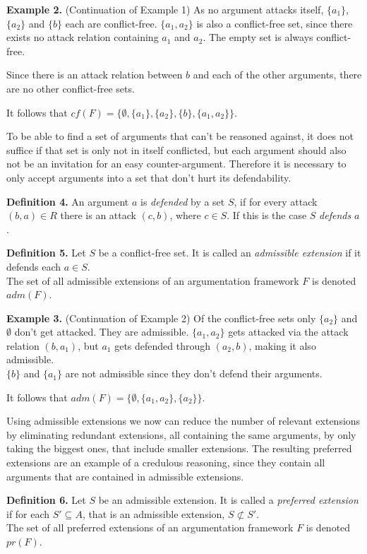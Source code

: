 \documentclass[draft,final]{vutinfth} %
\newcommand{\hl}{\par\vspace{6pt}} %
\newcommand{\cl}{\par\vspace{12pt}} %
\newcommand{\dl}{\par\vspace{24pt}} %
\begin{document}
\textbf{Example 2.} (Continuation of Example 1) As no argument attacks itself, $\{a_1\}$, $\{a_2\}$ and $\{b\}$ each are conflict-free. $\{a_1,a_2\}$ is also a conflict-free set, since there exists no attack relation containing $a_1$ and $a_2$. The empty set is always conflict-free.\hl
Since there is an attack relation between $b$ and each of the other arguments, there are no other conflict-free sets.\hl
It follows that $cf(F)=\{\emptyset,\{a_1\},\{a_2\},\{b\},\{a_1,a_2\}\}$.\dl

To be able to find a set of arguments that can't be reasoned against, it does not suffice if that set is only not in itself conflicted, but each argument should also not be an invitation for an easy counter-argument. Therefore it is necessary to only accept arguments into a set that don't hurt its defendability.\cl

\textbf{Definition 4.} An argument $a$ is \emph{defended} by a set $S$, if for every attack $(b,a)\in R$ there is an attack $(c,b)$, where $c\in S$. If this is the case $S$ \emph{defends} $a$.\cl

\textbf{Definition 5.} Let $S$ be a conflict-free set. It is called an \emph{admissible extension} if it defends each $a\in S$.\\
The set of all admissible extensions of an argumentation framework $F$ is denoted $adm(F)$.\cl

\textbf{Example 3.} (Continuation of Example 2) Of the conflict-free sets only $\{a_2\}$ and \(\emptyset\) don't get attacked. They are admissible. $\{a_1,a_2\}$ gets attacked via the attack relation $(b,a_1)$, but $a_1$ gets defended through $(a_2,b)$, making it also admissible.\\
$\{b\}$ and $\{a_1\}$ are not admissible since they don't defend their arguments.\hl
It follows that $adm(F)=\{\emptyset,\{a_1,a_2\},\{a_2\}\}$.\dl

Using admissible extensions we now can reduce the number of relevant extensions by eliminating redundant extensions, all containing the same arguments, by only taking the biggest ones, that include smaller extensions. The resulting preferred extensions are an example of a credulous reasoning, since they contain all arguments that are contained in admissible extensions.\cl

\textbf{Definition 6.} Let $S$ be an admissible extension. It is called a \emph{preferred extension} if for each $S'\subseteq A$, that is an admissible extension, $S\not\subset S'$.\\
The set of all preferred extensions of an argumentation framework $F$ is denoted $pr(F)$.\cl
\end{document}
